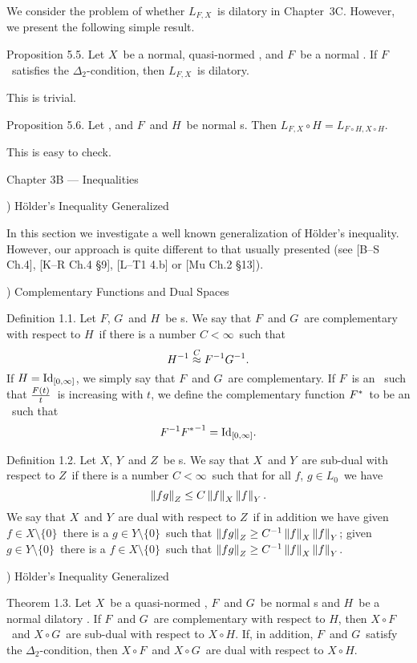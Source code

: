 We consider the problem of whether $L_{F,X}$\ is dilatory in Chapter~3C.
However, we present the following simple result.
 
\proclaim Proposition 5.5. Let $X$\ be a normal, quasi-normed \ris\onIzi,
and
$F$\ be a normal \af. If $F$\ satisfies the $\Delta_2$-condition,
then $L_{F,X}$\ is
dilatory.
 
\Proof This is trivial.
\endproof
 
\proclaim Proposition 5.6. Let \Xbanris\onIzi, and $F$\ and $H$\
be normal \af s.
Then $L_{F,X}\circ H = L_{F\circ H,X\circ H}$.
 
\Proof This is easy to check.
\endproof
 
\vfill
\eject
 
\beginsection Chapter 3B --- Inequalities
 
) H\"older's Inequality Generalized
 
In this section we investigate a well known generalization of H\"older's
inequality. However, our approach is quite different to that usually
presented
(see [B--S Ch.4], [K--R Ch.4 \S9], [L--T1 4.b] or [Mu Ch.2 \S13]).
 
) Complementary Functions and Dual Spaces
 
\proclaim Definition 1.1. Let $F$, $G$\ and $H$\ be \af s. We say
that $F$\ and
$G$\ are {\dt complementary with respect to $H$}\ if there is a number
$C<\infty$\ such that
$$ \invH \labelledapprox C \invF\invG .$$
If $H=\mathord{\rm Id}_{[0,\infty]}$, we simply say that $F$\ and $G$\ are {\dt
complementary}.
\moreproclaim
If $F$\ is an \af\ such that ${F(t)\over t}$\ is increasing with $t$, we
define the
{\dt complementary function} $F^*$\ to be an \af\ such that
$$ F^{-1} {F^*}^{-1} = \mathord{\rm Id}_{[0,\infty]} .$$
 
\proclaim Definition 1.2. Let $X$, $Y$\ and $Z$\ be \ris s. We say
that $X$\ and
$Y$\ are {\dt sub-dual with respect to $Z$}\ if there is a number
$C<\infty$\ such that for all $f$, $g\in L_0$\ we have
$$ \left\| fg \right\|_Z \le C \left\| f \right\|_X \left\| f \right\|_Y .$$
We say that $X$\ and $Y$\ are {\dt dual with respect to $Z$}\ if
in addition we
have
\itemi given $f\in X\setminus\{0\}$\ there is a $g\in Y\setminus\{0\}$\
such
that $\left\| fg \right\|_Z \ge C^{-1} \left\| f \right\|_X \left\| f \right\|_Y$;
\itemii given $g\in Y\setminus\{0\}$\ there is a $f\in X\setminus\{0\}$\
such
that $\left\| fg \right\|_Z \ge C^{-1} \left\| f \right\|_X \left\| f \right\|_Y$.
\endit
 
) H\"older's Inequality Generalized
 
\proclaim Theorem 1.3. Let $X$\ be a quasi-normed \ris,
$F$\ and $G$\ be normal \af s and $H$\ be a normal dilatory \af.
If $F$\ and $G$\
are complementary with respect to $H$, then $X\circ F$\ and $X\circ
G$\ are
sub-dual with respect to $X\circ H$. If, in addition, $F$\ and $G$\
satisfy the
$\Delta_2$-condition, then $X\circ F$\ and $X\circ G$\ are dual with
respect to
$X\circ H$.
 
